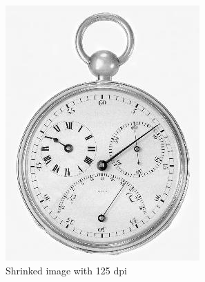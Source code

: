 \documentclass[UTF8]{ctexart}
\begin{document}
\begin{figure}[htbp]
\begin{subfigure}{0.3\textwidth}
        \includegraphics[width=\linewidth]{shrinked_image.jpg}
        \caption{Shrinked image with 125 dpi}
    \end{subfigure}%
    \hfill
    \begin{subfigure}{0.3\textwidth}
        \centering

\end{subfigure}
\end{figure}
\end{document}
